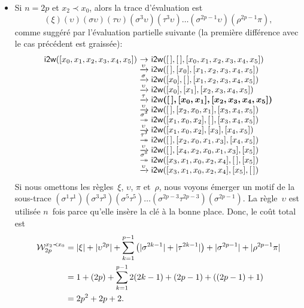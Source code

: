 \begin{itemize}
  \item Si \(n = 2p\) et \(x_2 \prec x_0\), alors la trace
    d'évaluation est
    \begin{equation*}
      (\xi)(\upsilon)(\sigma\upsilon)(\tau\upsilon)
      (\sigma^3\upsilon)(\tau^3\upsilon)
      \ldots (\sigma^{2p-1}\upsilon)(\rho^{2p-1}\pi),
    \end{equation*}
    comme suggéré par l'évaluation partielle suivante (la première
    différence avec le cas précédent est graissée):
\begin{equation*}
\begin{array}{@{}r@{\;}c@{\;}l@{}}
\fun{i2w}([x_{0},x_{1},x_{2},x_{3},x_{4},x_{5}])
& \rightarrow
& \fun{i2w}(\el,\el,[x_{0},x_{1},x_{2},x_{3},x_{4},x_{5}])\\
& \xrightarrow{\smash{\upsilon}}
& \fun{i2w}(\el,[x_{0}],[x_{1},x_{2},x_{3},x_{4},x_{5}])\\
& \xrightarrow{\smash{\sigma}}
& \fun{i2w}([x_{0}],\el,[x_{1},x_{2},x_{3},x_{4},x_{5}])\\
& \xrightarrow{\smash{\upsilon}}
& \fun{i2w}([x_{0}],[x_{1}],[x_{2},x_{3},x_{4},x_{5}])\\
& \xrightarrow{\smash{\tau}}
& \boldsymbol{\fun{i2w}(\el,[x_{0},x_{1}],[x_{2},x_{3},x_{4},x_{5}])}\\
& \xrightarrow{\smash{\upsilon}}
& \fun{i2w}(\el,[x_{2},x_{0},x_{1}],[x_{3},x_{4},x_{5}])\\
& \stackrel{\smash{\sigma^{\smash{3}}}}{\twoheadrightarrow}
& \fun{i2w}([x_{1},x_{0},x_{2}],\el,[x_{3},x_{4},x_{5}])\\
& \xrightarrow{\smash{\upsilon}}
& \fun{i2w}([x_{1},x_{0},x_{2}],[x_{3}],[x_{4},x_{5}])\\
& \stackrel{\smash{\tau^{\smash{3}}}}{\twoheadrightarrow}
& \fun{i2w}(\el,[x_{2},x_{0},x_{1},x_{3}],[x_{4},x_{5}])\\
& \xrightarrow{\smash{\upsilon}}
& \fun{i2w}(\el,[x_{4},x_{2},x_{0},x_{1},x_{3}],[x_{5}])\\
& \stackrel{\smash{\sigma^{\smash{5}}}}{\twoheadrightarrow}
& \fun{i2w}([x_{3},x_{1},x_{0},x_{2},x_{4}],\el,[x_{5}])\\
& \xrightarrow{\smash{\upsilon}}
& \fun{i2w}([x_{3},x_{1},x_{0},x_{2},x_{4}],[x_{5}],\el)
\end{array}
\end{equation*}
Si nous omettons les règles~\(\xi\), \(\upsilon\), \(\pi\)
et~\(\rho\), nous voyons émerger un motif de la sous-trace
\((\sigma^1\tau^1)(\sigma^3\tau^3)(\sigma^5\tau^5) \ldots
(\sigma^{2p-3}\tau^{2p-3})(\sigma^{2p-1})\). La règle~\(\upsilon\) est
utilisée \(n\)~fois parce qu'elle insère la clé à la bonne
place. Donc, le coût total est
\begin{align*}
\W{x_2 \prec x_0}{2p}
   &= \len{\xi} + \len{\upsilon^{2p}}
           + \sum_{k=1}^{p-1}{\left(\len{\sigma^{2k-1}} + \len{\tau^{2k-1}}\right)}
           + \len{\sigma^{2p-1}} + \len{\rho^{2p-1}\pi}\\
   &= 1 + (2p) + \sum_{k=1}^{p-1}{2(2k-1)} + (2p-1) + ((2p - 1) + 1)\\
   &= 2p^2 + 2p + 2.
\end{align*}
\end{itemize}
